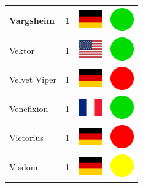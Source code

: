 \documentclass[12pt, a4paper, twoside]{report}
\begin{document}
\begin{center}
\begin{longtable}{|p{5cm}|p{2cm}|p{2cm}|p{2cm}|}
			Vargsheim & 1 & \includegraphics[width=1cm]{4x3/de} & \includegraphics[width=1cm]{likes/y} \\ \hline
			Vektor & 1 & \includegraphics[width=1cm]{4x3/us} & \includegraphics[width=1cm]{likes/y} \\ \hline
			Velvet Viper & 1 & \includegraphics[width=1cm]{4x3/de} & \includegraphics[width=1cm]{likes/n} \\ \hline
			Venefixion & 1 & \includegraphics[width=1cm]{4x3/fr} & \includegraphics[width=1cm]{likes/y} \\ \hline
			Victorius & 1 & \includegraphics[width=1cm]{4x3/de} & \includegraphics[width=1cm]{likes/n} \\ \hline
			Visdom & 1 & \includegraphics[width=1cm]{4x3/de} & \includegraphics[width=1cm]{likes/m} \\ \hline

\end{longtable}
\end{center}
\end{document}
